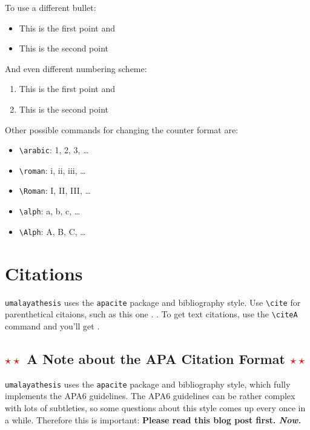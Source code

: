 To use a different bullet:

\begin{itemize}[label=$\star$]
  \item This is the first point and
  \item This is the second point
\end{itemize}

And even different numbering scheme:

\begin{enumerate}[label=(\roman*)]
  \item This is the first point and
  \item This is the second point
\end{enumerate}

Other possible commands for changing the counter format are:

\begin{itemize}
\item \verb|\arabic|: 1, 2, 3, \ldots
\item \verb|\roman|: i, ii, iii, \ldots
\item \verb|\Roman|: I, II, III, \ldots
\item \verb|\alph|: a, b, c, \ldots
\item \verb|\Alph|: A, B, C, \ldots
\end{itemize}

\section{Citations}

\texttt{umalayathesis} uses the \texttt{apacite} package and bibliography style. Use \verb|\cite| for parenthetical citaions, such as this one \cite{audibert:2004}. \cite{budanitsky:hirst:2006}. To get text citations, use the \verb|\citeA| command and you'll get \cite{audibert:2004}.

\subsection{\textcolor{red}{$\star\star$} A Note about the APA Citation Format \textcolor{red}{$\star\star$}}

\texttt{umalayathesis} uses the \texttt{apacite} package and bibliography style, which fully implements the APA6 guidelines. The APA6 guidelines can be rather complex with lots of subtleties, so some questions about this style comes up every once in a while. Therefore this is important: \textbf{Please read this blog post first. \emph{Now.}}

